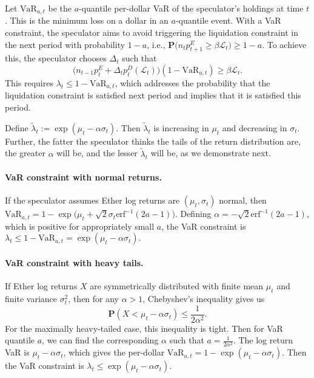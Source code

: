 Let $\text{VaR}_{a,t}$ be the $a$-quantile per-dollar VaR of the speculator's holdings at time $t$. This is the minimum loss on a dollar in an $a$-quantile event. With a VaR constraint, the speculator aims to avoid triggering the liquidation constraint in the next period with probability $1-a$, i.e.,
$\mathbf{P} \Big( n_t p^E_{t+1} \geq \beta \mathcal{L}_t \Big) \geq 1-a.$ To achieve this, the speculator chooses $\Delta_t$ such that
$$\Big(n_{t-1}p^E_t + \Delta_t p_t^D(\mathcal{L}_t)\Big) (1-\text{VaR}_{a,t}) \geq \beta \mathcal{L}_t.$$
This requires $\lambda_t \leq 1-\text{VaR}_{a,t}$, which addresses the probability that the liquidation constraint is satisfied next period and implies that it is satisfied this period.

Define $\tilde \lambda_t := \exp(\mu_t -\alpha\sigma_t)$. Then $\tilde \lambda_t$ is increasing in $\mu_t$ and decreasing in $\sigma_t$. Further, the fatter the speculator thinks the tails of the return distribution are, the greater $\alpha$ will be, and the lesser $\tilde \lambda_t$ will be, as we demonstrate next.

\paragraph{VaR constraint with normal returns.}
If the speculator assumes Ether log returns are $(\mu_t, \sigma_t)$ normal, then
$\text{VaR}_{a,t} = 1 - \exp\Big(\mu_t + \sqrt{2} \sigma_t \text{erf}^{-1}(2a-1)\Big).$
Defining $\alpha = - \sqrt{2}\text{erf}^{-1}(2a-1)$, which is positive for appropriately small $a$, the VaR constraint is
$\lambda_t \leq 1 - \text{VaR}_{a,t} = \exp(\mu_t - \alpha \sigma_t).$

\paragraph{VaR constraint with heavy tails.}
If Ether log returns $X$ are symmetrically distributed with finite mean $\mu_t$ and finite variance $\sigma_t^2$, then for any $\alpha>1$, Chebyshev's inequality gives us
$$\mathbf{P}(X < \mu_t -\alpha\sigma_t) \leq \frac{1}{2\alpha^2}.$$
For the maximally heavy-tailed case, this inequality is tight. Then for VaR quantile $a$, we can find the corresponding $\alpha$ such that $a = \frac{1}{2\alpha^2}$. The log return VaR is $\mu_t-\alpha\sigma_t$, which gives the per-dollar $\text{VaR}_{a,t} = 1-\exp(\mu_t-\alpha\sigma_t)$. Then the VaR constraint is $\lambda_t \leq \exp(\mu_t - \alpha\sigma_t)$.



